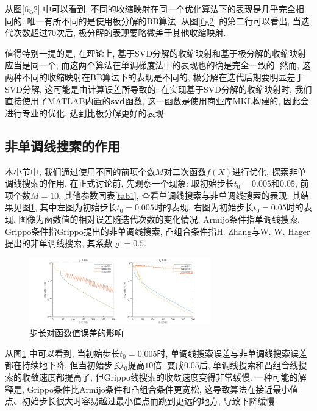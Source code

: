 \documentclass[UTF8]{ctexart}
\begin{document}
从图\ref{fig2} 中可以看到, 不同的收缩映射在同一个优化算法下的表现是几乎完全相同的. 唯一有所不同的是使用极分解的BB算法. 从图\ref{fig2} 的第二行可以看出, 当迭代次数超过$70$次后, 极分解的表现要略微差于其他收缩映射. 

值得特别一提的是, 在理论上, 基于SVD分解的收缩映射和基于极分解的收缩映射应当是同一个, 而这两个算法在单调梯度法中的表现也的确是完全一致的. 然而, 这两种不同的收缩映射在BB算法下的表现是不同的, 极分解在迭代后期要明显差于SVD分解, 这可能是由计算误差所导致的: 在实现基于SVD分解的收缩映射时, 我们直接使用了MATLAB内置的\textbf{svd}函数, 这一函数是使用商业库MKL构建的, 因此会进行专业的优化, 达到比极分解更好的表现. 

\subsection{非单调线搜索的作用}

本小节中, 我们通过使用不同的前项个数$M$对二次函数$f(X)$进行优化, 探索非单调线搜索的作用. 在正式讨论前, 先观察一个现象: 取初始步长$t_0=0.005$和$0.05$, 前项个数$M=10$, 其他参数同表\ref{tab1}, 查看单调线搜索与非单调线搜索的表现. 其结果见图\ref{fig3}, 其中左图为初始步长$t_0=0.005$时的表现, 右图为初始步长$t_0=0.05$时的表现, 图像为函数值的相对误差随迭代次数的变化情况, Armijo条件指单调线搜索, Grippo条件指Grippo提出的非单调线搜索, 凸组合条件指H. Zhang与W. W. Hager提出的非单调线搜索, 其系数$\varrho=0.5$. 

\begin{figure}[htb]
    \centering
    \includegraphics[width=0.7\textwidth]{Q2-figure/3.png}
    \caption{步长对函数值误差的影响}\label{fig3}
\end{figure}

从图\ref{fig3} 中可以看到, 当初始步长$t_0=0.005$时, 单调线搜索误差与非单调线搜索误差都在持续地下降, 但当初始步长$t_0$提高$10$倍, 变成$0.05$后, 单调线搜索和凸组合线搜索的收敛速度都提高了, 但Grippo线搜索的收敛速度变得非常缓慢. 一种可能的解释是, Grippo条件比Armijo条件和凸组合条件更宽松, 这导致算法在接近最小值点、初始步长很大时容易越过最小值点而跳到更远的地方, 导致下降缓慢. 

\end{document}
